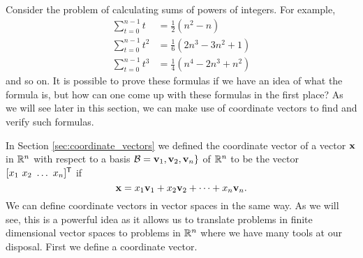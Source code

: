   \label{sec:coordinate_vectors_vector_spaces}

\vspace*{-17 pt}

\vspace*{13 pt}


Consider the problem of calculating sums of powers of integers. For example, 
\begin{align*}
\sum_{t=0}^{n-1} t &= \frac{1}{2}\left(n^2-n\right) \\
\sum_{t=0}^{n-1} t^2 &= \frac{1}{6}\left(2n^3-3n^2+1\right) \\
\sum_{t=0}^{n-1} t^3 &= \frac{1}{4}\left(n^4-2n^3+n^2\right) 
\end{align*}
and so on. It is possible to prove these formulas if we have an idea of what the formula is, but how can one come up with these formulas in the first place? As we will see later in this section, we can make use of coordinate vectors to find and verify such formulas. 


In Section \ref{sec:coordinate_vectors} we defined the coordinate vector of a vector $\mathbf{x}$ in $\mathbb{R}^n$ with respect to a basis $\mathcal{B} = \mathbf{v}_1, \mathbf{v}_2, \mathbf{v}_n\}$ of $\mathbb{R}^n$ to be the vector $[x_1 \ x_2 \ \ldots \ x_n]^{\mathsf{T}}$ if 
\[\mathbf{x} = x_1 \mathbf{v}_1 + x_2 \mathbf{v}_2 + \cdots + x_n \mathbf{v}_n.\]
We can define coordinate vectors in vector spaces in the same way. As we will see, this is a powerful idea as it allows us to translate problems in finite dimensional vector spaces to problems in $\mathbb{R}^n$ where we have many tools at our disposal. First we define a coordinate vector.

